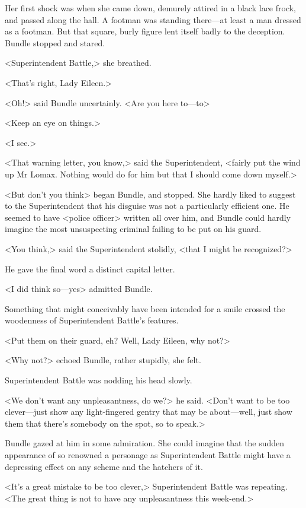 Her first shock was when she came down, demurely attired in a black lace frock, and passed along the hall. A footman was standing there—at least a man dressed as a footman. But that square, burly figure lent itself badly to the deception. Bundle stopped and stared.

<Superintendent Battle,> she breathed.

<That's right, Lady Eileen.>

<Oh!> said Bundle uncertainly. <Are you here to—to\longdash>

<Keep an eye on things.>

<I see.>

<That warning letter, you know,> said the Superintendent, <fairly put the wind up Mr Lomax. Nothing would do for him but that I should come down myself.>

<But don't you think\longdash> began Bundle, and stopped. She hardly liked to suggest to the Superintendent that his disguise was not a particularly efficient one. He seemed to have <police officer> written all over him, and Bundle could hardly imagine the most unsuspecting criminal failing to be put on his guard.

<You think,> said the Superintendent stolidly, <that I might be recognized?>

He gave the final word a distinct capital letter.

<I did think so—yes\longdash> admitted Bundle.

Something that might conceivably have been intended for a smile crossed the woodenness of Superintendent Battle's features.

<Put them on their guard, eh? Well, Lady Eileen, why not?>

<Why not?> echoed Bundle, rather stupidly, she felt.

Superintendent Battle was nodding his head slowly.

<We don't want any unpleasantness, do we?> he said. <Don't want to be too clever—just show any light-fingered gentry that may be about—well, just show them that there's somebody on the spot, so to speak.>

Bundle gazed at him in some admiration. She could imagine that the sudden appearance of so renowned a personage as Superintendent Battle might have a depressing effect on any scheme and the hatchers of it.

<It's a great mistake to be too clever,> Superintendent Battle was repeating. <The great thing is not to have any unpleasantness this week-end.>

